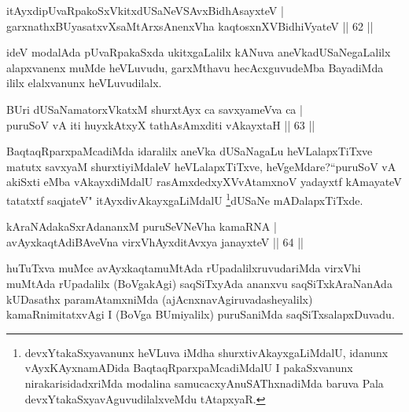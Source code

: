 \begin{shl}
itAyxdipUvaRpakoSxVkitxdUSaNeVSAvxBidhAsayxteV |\\
garxnathxBUyasatxvXsaMtArxsAnenxVha kaqtosxnXV\s BidhiVyateV \hfill || 62 ||
\end{shl}

\begin{artha}
ideV modalAda pUvaRpakaSxda ukitxgaLalilx kANuva aneVkadUSaNegaLalilx alapxvanenx muMde heVLuvudu, garxMthavu hecAcxguvudeMba BayadiMda ililx elalxvanunx heVLuvudilalx.
\end{artha}


\begin{shl}
BUri dUSaNamatorxVkatxM shurxtAyx ca savxyameVva ca |\\
puruSoV vA iti huyxkAtxyX tathA\s sAmxditi vAkayxtaH \hfill || 63 ||
\end{shl}

\begin{artha}
BaqtaqRparxpaMcadiMda idaralilx aneVka dUSaNagaLu heVLalapxTiTxve matutx savxyaM 
shurxtiyiMdaleV heVLalapxTiTxve, heVgeMdare?``puruSoV vA akiSxti eMba vAkayxdiMdalU rasAmxdedxyXV\s \s vAtamxnoV yadayxtf kAmayateV tatatxtf saqjateV" itAyxdivAkayxgaLiMdalU
\footnote{devxYtakaSxyavanunx heVLuva iMdha shurxtivAkayxgaLiMdalU, idanunx vAyxKAyxnamADida BaqtaqRparxpaMcadiMdalU I pakaSxvanunx nirakarisidadxriMda modalina samucacxyAnuSAThxnadiMda baruva Pala  devxYtakaSxyavAguvudilalxveMdu tAtapxyaR.}dUSaNe mADalapxTiTxde.
\end{artha}


\begin{shl}
kAraNAdakaSxrAdananxM puruSeVNeVha kamaRNA |\\
avAyxkaqtAdiBAveVna virxVhAyxditAvxya janayxteV \hfill || 64 ||
\end{shl}

\begin{artha}
huTuTxva muMce avAyxkaqtamuMtAda rUpadalilxruvudariMda virxVhi muMtAda rUpadalilx (BoVgakAgi) saqSiTxyAda ananxvu saqSiTxkAraNanAda kUDasathx paramAtamxniMda (ajAcnxnavAgiruvadasheyalilx) kamaRnimitatxvAgi I (BoVga BUmiyalilx) puruSaniMda saqSiTxsalapxDuvadu.
\end{artha}


